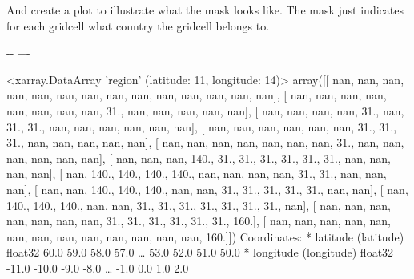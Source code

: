 \documentclass[letterpaper,10pt,english]{sphinxmanual}
\newlength\nbsphinxcodecellspacing
\begin{document}
And create a plot to illustrate what the mask looks like. The mask just indicates for each gridcell what country the gridcell belongs to.

{
\begin{sphinxVerbatim}[commandchars=\\\{\}]
\llap{\color{nbsphinxin}[9]:\,\hspace{\fboxrule}\hspace{\fboxsep}}
\end{sphinxVerbatim}
}

{

\kern-\sphinxverbatimsmallskipamount\kern-\baselineskip
\kern+\FrameHeightAdjust\kern-\fboxrule
\vspace{\nbsphinxcodecellspacing}

\begin{sphinxVerbatim}[commandchars=\\\{\}]
\llap{\color{nbsphinxout}[9]:\,\hspace{\fboxrule}\hspace{\fboxsep}}<xarray.DataArray 'region' (latitude: 11, longitude: 14)>
array([[ nan,  nan,  nan,  nan,  nan,  nan,  nan,  nan,  nan,  nan,  nan,
         nan,  nan,  nan],
       [ nan,  nan,  nan,  nan,  nan,  nan,  nan,  nan,  31.,  nan,  nan,
         nan,  nan,  nan],
       [ nan,  nan,  nan,  nan,  31.,  nan,  31.,  31.,  nan,  nan,  nan,
         nan,  nan,  nan],
       [ nan,  nan,  nan,  nan,  nan,  nan,  31.,  31.,  31.,  nan,  nan,
         nan,  nan,  nan],
       [ nan,  nan,  nan,  nan,  nan,  nan,  nan,  31.,  nan,  nan,  nan,
         nan,  nan,  nan],
       [ nan,  nan,  nan, 140.,  31.,  31.,  31.,  31.,  31.,  31.,  nan,
         nan,  nan,  nan],
       [ nan, 140., 140., 140., 140.,  nan,  nan,  nan,  nan,  31.,  31.,
         nan,  nan,  nan],
       [ nan,  nan, 140., 140., 140.,  nan,  nan,  31.,  31.,  31.,  31.,
         31.,  nan,  nan],
       [ nan, 140., 140., 140.,  nan,  nan,  31.,  31.,  31.,  31.,  31.,
         31.,  31.,  nan],
       [ nan,  nan,  nan,  nan,  nan,  nan,  nan,  31.,  31.,  31.,  31.,
         31.,  31., 160.],
       [ nan,  nan,  nan,  nan,  nan,  nan,  nan,  nan,  nan,  nan,  nan,
         nan,  nan, 160.]])
Coordinates:
  * latitude   (latitude) float32 60.0 59.0 58.0 57.0 {\ldots} 53.0 52.0 51.0 50.0
  * longitude  (longitude) float32 -11.0 -10.0 -9.0 -8.0 {\ldots} -1.0 0.0 1.0 2.0
\end{sphinxVerbatim}
}
\end{document}
